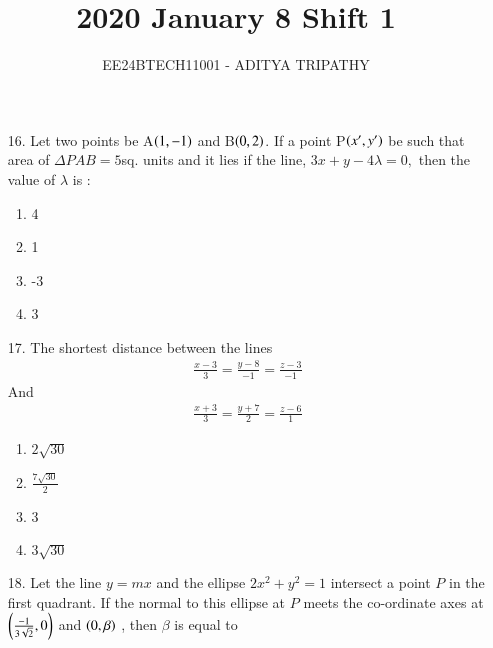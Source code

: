 \documentclass[journal,12pt,onecolumn]{IEEEtran}
\theoremstyle{remark}
\begin{document}

\vspace{3cm}

\title{2020 January 8 Shift 1}
\author{EE24BTECH11001 -  ADITYA TRIPATHY}
\maketitle

\renewcommand{\thefigure}{\theenumi}
\renewcommand{\thetable}{\theenumi}

\begin{enumerate}
	\item[16.] 
		Let two points be A$\left(1, -1\right)$ and B$\left(0, 2\right)$. If a point P$\left(x', y'\right)$ be
		such that area of $\Delta PAB = 5$sq. units and it lies if the line, $3x + y - 4\lambda = 0,$ then
		the value of $\lambda$ is :
	\begin{multicols}{4}
		\begin{enumerate}
			\item 4 
			\columnbreak
			\item 1
			\columnbreak
			\item -3
			\columnbreak
			\item 3
		\end{enumerate}
	\end{multicols}

	\item[17.] The shortest distance between the lines
		\begin{align*}
		\frac{x-3}{3} = \frac{y-8}{-1} = \frac{z-3}{-1}
		\end{align*} And
		\begin{align}
			\frac{x+3}{3} = \frac{y+7}{2} = \frac{z-6}{1}
		\end{align}
	\begin{multicols}{4}
		\begin{enumerate}
			\item $2\sqrt{30}$ \columnbreak
			\item $\frac{7\sqrt{30}}{2}$ \columnbreak
			\item 3 \columnbreak
			\item $3\sqrt{30}$
		\end{enumerate}
	\end{multicols}


\item[18.] Let the line $y = mx$ and the ellipse $2x^2 + y^2 = 1$ intersect a point $P$ in the first quadrant. If the 
	normal to this ellipse at $P$ meets the co-ordinate axes at $\left(\frac{-1}{3\sqrt{2}}, 0\right)$ and $\left(0, \beta\right)$
	, then $\beta$ is equal to 
		\begin{enumerate}
		\end{enumerate}
		

\end{enumerate}
\end{document}
